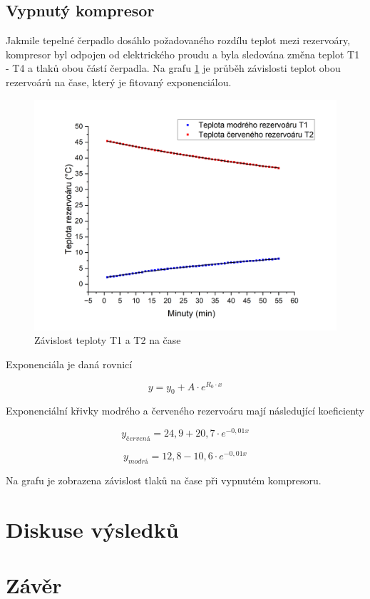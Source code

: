 \subsection{Vypnutý kompresor}

Jakmile tepelné čerpadlo dosáhlo požadovaného rozdílu teplot mezi rezervoáry, kompresor byl odpojen od elektrického proudu a byla sledována změna teplot T1 - T4 a tlaků obou částí čerpadla. Na grafu \ref{fig:T1(t),T2(t)-vyp} je průběh závislosti teplot obou rezervoárů na čase, který je fitovaný exponenciálou.

\begin{figure}[h]
    \centering
    \includegraphics[width=0.68\linewidth]{27 - Tepelné čerpadlo//Protokol_tepelné čerpadlo//img/T1(t), T2(t) vyp.png}
    \caption{Závislost teploty T1 a T2 na čase}
    \label{fig:T1(t),T2(t)-vyp}
\end{figure}

Exponenciála je daná rovnicí

\begin{equation}
    \nonumber
    y = y_0 + A \cdot e^{R_0 \cdot x}
\end{equation}

Exponenciální křivky modrého a červeného rezervoáru mají následující koeficienty

\begin{equation}
    \nonumber
    y_{červená} = 24,9 + 20,7 \cdot e^{-0,01 x}
\end{equation}

\begin{equation}
    \nonumber
    y_{modrá} = 12,8 - 10,6 \cdot e^{-0,01 x}
\end{equation}

Na grafu je zobrazena závislost tlaků na čase při vypnutém kompresoru.



\section{Diskuse výsledků}

\section{Závěr}
